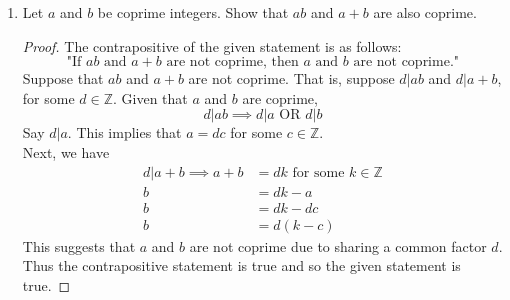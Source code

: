 \documentclass[letterpaper]{article}
\begin{document}
\begin{enumerate}
\begin{enumerate}
		\item Use the previous result together with the division algorithm to show that no integer in
		the sequence is a perfect square.
			\begin{proof} [Proof by Contradiction]
				Given that each integer in the sequence can be written as $4k+3$, suppose 
				that each integer can be written as a perfect square. That is,
				\[ 4k+3=a^2, a\in\mathbb{Z} \]
				\begin{enumerate}
					\item Case 1: a is odd, ie. $a=2p+1, p\in\mathbb{Z}$
						\begin{align*}
							4k+3 &= (2p+1)^2 \\
							&= 4p^2+4p+1 \\
							&= 4(p^2+p)+1
						\end{align*}
						By the division algorithm, $\exists$ integers $q$ and $r$ such that 
						$a = bq + r$. In this instance, $q=4$ and $r=3$. If a is an odd 
						integer, $r=1$, a contradiction.
					\item Case 2: a is even, ie. $a=2p, p\in\mathbb{Z}$
						\begin{align*}
							4k+3 &= (2p)^2 \\
							&= 4(p^2)
						\end{align*}
						If a is an even integer, $r=0$, a contradiction.
				\end{enumerate}
				The supposition is false, thus no integer in the sequence is a 
				perfect square.
			\end{proof}
	\end{enumerate}

	\item Let $a$ and $b$ be coprime integers. Show that $ab$ and $a+b$ are also coprime.
	\begin{proof}
		The contrapositive of the given statement is as follows:
		\[
			\text{"If } ab \text{ and } a+b \text{ are not coprime, then } 
			a \text{ and } b \text{ are not coprime."}
		\]
		Suppose that $ab$ and $a+b$ are not coprime. That is, suppose 
		$d|ab$ and $d|a+b$, for some $d\in\mathbb{Z}$. Given that $a$ and $b$
		are coprime,
		\[
			d|ab \implies d|a \text{ OR } d|b
		\]
		Say $d|a$. This implies that $a=dc$ for some $c\in\mathbb{Z}$. \\
		Next, we have
		\begin{align*}
			d|a+b \implies a+b &= dk \text{ for some } k\in\mathbb{Z} \\
			b &= dk - a \\
			b &= dk - dc \\
			b &= d(k-c) 
		\end{align*}
		This suggests that $a$ and $b$ are not coprime due to sharing a common factor $d$.
		Thus the contrapositive statement is true and so the given statement is true.


\end{proof}
\end{enumerate}
\end{document}
